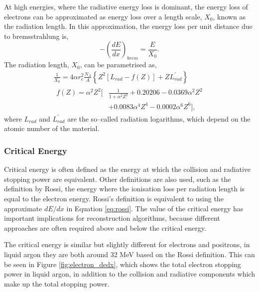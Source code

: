 At high energies, where the radiative energy loss is dominant, the energy loss
of electrons can be approximated as energy loss over a length scale, $X_0$,
known as the radiation length. In this approximation, the energy loss per 
unit distance due to bremsstrahlung is, 
\begin{equation}
	- \left( \frac{dE}{dx} \right)_{brem} = \frac{E}{X_0}.
	\label{eq:rossi}
\end{equation}
The radiation length, $X_0$, can be parametrised as,
\begin{equation}
	\begin{gathered}
		\frac{1}{X_0} = 4 \alpha r_e^2 \frac{N_A}{A} \left\{ Z^2 \left[L_{rad} - f(Z)\right] + Z
		L^\prime_{rad} \right\} \\
		\begin{aligned}
			f(Z) = \alpha^2 Z^2 \bigg[ &\frac{1}{1 + \alpha^2 Z^2} + 0.20206 - 0.0369
			\alpha^2 Z^2 \\ &+ 0.0083 \alpha^4 Z^4 -0.0002 \alpha^6 Z^6 \bigg],
		\end{aligned}
	\end{gathered}
	\label{eq:rad_length}
\end{equation}
where $L_{rad}$ and $L_{rad}^\prime$ are the so--called radiation logarithms,
which depend on the atomic number of the material\cite{Tsai:1973py}.

\subsubsection*{Critical Energy}
Critical energy is often defined as the energy at which the collision and 
radiative stopping power are equivalent. Other definitions are also used, such
as the definition by Rossi, the energy where the ionisation loss per
radiation length is equal to the electron energy\cite{Rossi:1952kt}. Rossi's 
definition is equivalent to using the approximate $dE/dx$ in Equation 
\ref{eq:rossi}\cite{PhysRevD.98.030001}. The value of the critical energy has 
important implications for reconstruction algorithms, because different 
approaches are often required above and below the critical energy. 

The critical energy is similar but slightly different for electrons and 
positrons, in liquid argon they are both around 32 MeV based on the Rossi 
definition\cite{pdg_atomictables}. This can be seen in Figure 
\ref{fig:electron_dedx}, which shows the total electron stopping power in 
liquid argon, in addition to the collision and radiative components which make 
up the total stopping power. 

